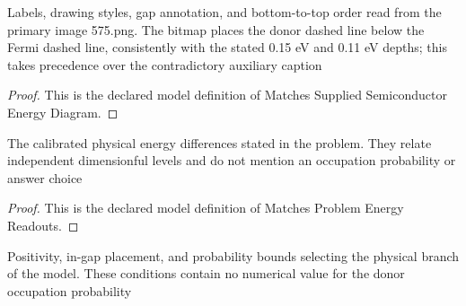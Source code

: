 \begin{definition}
  \label{def:physics:phyx-mini-0575:phyxminiproblems-problemphyxmini0575-matchessuppliedsemiconductorenergydiagram}
  Labels, drawing styles, gap annotation, and bottom-to-top order read from the primary image 575.png. The bitmap places the donor dashed line below the Fermi dashed line, consistently with the stated 0.15 eV and 0.11 eV depths; this takes precedence over the contradictory auxiliary caption
\end{definition}
\begin{proof}
  This is the declared model definition of Matches Supplied Semiconductor Energy Diagram.
\end{proof}
\begin{definition}
  \label{def:physics:phyx-mini-0575:phyxminiproblems-problemphyxmini0575-matchesproblemenergyreadouts}
  The calibrated physical energy differences stated in the problem. They relate independent dimensionful levels and do not mention an occupation probability or answer choice
\end{definition}
\begin{proof}
  This is the declared model definition of Matches Problem Energy Readouts.
\end{proof}
\begin{definition}
  \label{def:physics:phyx-mini-0575:phyxminiproblems-problemphyxmini0575-hasphysicalsemiconductorparameters}
  Positivity, in-gap placement, and probability bounds selecting the physical branch of the model. These conditions contain no numerical value for the donor occupation probability
\end{definition}
